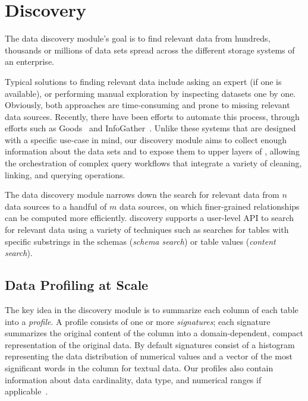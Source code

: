 \section{Discovery}
\label{sec:discovery}

The data discovery module's goal is to find relevant data from hundreds, thousands or
 millions of data sets  spread across the different storage systems of an
enterprise.

Typical solutions to finding relevant data include asking an expert (if one is available), or  performing
manual exploration by inspecting datasets one by one.  Obviously, both approaches are
time-consuming and prone to missing relevant data sources.  
Recently, there have been efforts to automate this process, through efforts such as
Goods~\cite{DBLP:conf/sigmod/HalevyKNOPRW16} and 
InfoGather~\cite{DBLP:conf/sigmod/YakoutGCC12}.   Unlike these systems
that are designed with a specific use-case in mind, our discovery module aims to
collect enough information about the data sets and to expose them to upper layers
of \dcv, allowing the orchestration of complex query workflows that integrate a variety of cleaning, linking, and querying operations.

The data discovery module narrows down the search for relevant data from
$n$ data sources to a handful of $m$ data sources, on which finer-grained relationships can be computed more efficiently.
\dcv discovery supports a user-level API to search for relevant data using a
variety of techniques such as searches for tables with specific substrings in the schemas ({\it schema search}) or table values ({\it content search}). 

\subsection{Data Profiling at Scale}

The key idea in the discovery module is to summarize each column of each table into a {\em profile}.
A profile consists of one or more {\it signatures};  each signature summarizes the original content of the column into a domain-dependent,
compact representation of the original data.  By default signatures consist of a histogram representing the
data distribution of numerical values and  a vector of the most significant words
in the column for textual data.  Our profiles also contain information about data cardinality,
data type, and numerical ranges if applicable~\cite{profiling_survey}.


